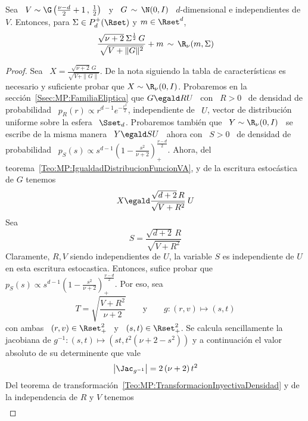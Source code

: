 %
\begin{lema}\label{Lem:MP:StudentRGamma}
%
  Sea \ $V \sim \G\left( \frac{\nu-d}{2}+1 \,  , \, \frac12 \right)$ \ y \ $G \,
  \sim \,  \N(0,I)$ \  $d$-dimensional e independientes  de $V$.  Entonces, para
  $\Sigma \in P_d^+(\Rset)$ y $m \in \Rset^d$,
  \[
  \frac{\sqrt{\nu+2} \:  \Sigma^{\frac12} \, G}{\sqrt{V  + \|G\|^2}} + m \,  \sim \,
  \R_\nu( m , \Sigma )
  \]
\end{lema}
\begin{proof}
  Sea \ $X = \frac{\sqrt{\nu+2} \,  G}{\sqrt{V + \|G\|}}$.  De la nota siguiendo
  la tabla  de caracter\'isticas  es necesario y  suficiente probar que  $X \sim
  \R_\nu(0,I)$.  Probaremos en la secci\'on~\ref{Ssec:MP:FamiliaEliptica} que $G
  \egald R U$  \ con \ $R >  0$ \ de densidad de probabilidad  \ $p_R(r) \propto
  r^{d-1} e^{-\frac{r^2}{2}}$, independiente de  \ $U$, vector de distribuci\'on
  uniforme  sobre la esfera  \ $\Sset_d$.   Probaremos tambi\'en  que \  $Y \sim
  \R_\nu(0,I)$ \ se escribe de la misma manera \ $Y \egald S U$ \ ahora con \ $S
  >  0$ \  de densidad  de probabilidad  \ $p_S(s)  \propto s^{d-1}  \left(  1 -
    \frac{s^2}{\nu+2}       \right)_+^{\frac{\nu-d}{2}}$.        Ahora,      del
  teorema~\ref{Teo:MP:IgualdadDistribucionFuncionVA},   y    de   la   escritura
  estoc\'astica de $G$ tenemos
  \[
  X \egald \frac{\sqrt{d+2} \, R}{\sqrt{V + R^2}} \: U
  \]
  Sea
  \[
  S = \frac{\sqrt{d+2} \, R}{\sqrt{V + R^2}}
  \]
  Claramente,  $R,  V$  siendo  independientes   de  $U$,  la  variable  $S$  es
  independiente de  $U$ en esta  escritura estocastica. Entonces,  sufice probar
  que    $p_S(s)    \propto     s^{d-1}    \left(    1    -    \frac{s^2}{\nu+2}
  \right)_+^{\frac{\nu-d}{2}}$. Por eso, sea
  \[
  T = \sqrt{\frac{V+R^2}{\nu+2}} \qquad \mbox{y} \qquad g: (r,v) \mapsto (s,t)
  \]
  con ambas  \ $(r,v) \in  \Rset_+^2$ \ y  \ $(s,t) \in \Rset_+^2$.   Se calcula
  sencillamente  la  jacobiana  de $g^{-1}:  (s,t)  \mapsto  \left(  s t  ,  t^2
    (\nu+2-s^2) \right)$ y a continuaci\'on el valor absoluto de su determinente
  que vale
  \[
  \left| \Jac_{g^{-1}} \right| = 2 \, (\nu+2) \, t^2
  \]
  Del teorema de transformaci\'on~\ref{Teo:MP:TransformacionInyectivaDensidad} y
  de la independencia de $R$ y $V$ tenemos
  \begin{eqnarray*}

\end{eqnarray*}
\end{proof}
